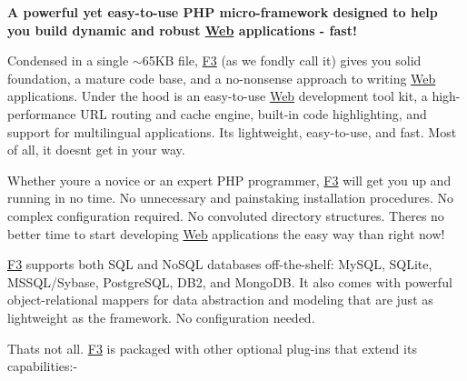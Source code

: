\href{http://fatfree.sf.net/}{\tt }

{\bfseries A powerful yet easy-\/to-\/use P\+HP micro-\/framework designed to help you build dynamic and robust \hyperlink{class_web}{Web} applications -\/ fast!}

\href{https://flattr.com/submit/auto?user_id=phpfatfree&url=https://github.com/bcosca/fatfree}{\tt }

Condensed in a single $\sim$65\+KB file, \hyperlink{class_f3}{F3} (as we fondly call it) gives you solid foundation, a mature code base, and a no-\/nonsense approach to writing \hyperlink{class_web}{Web} applications. Under the hood is an easy-\/to-\/use \hyperlink{class_web}{Web} development tool kit, a high-\/performance U\+RL routing and cache engine, built-\/in code highlighting, and support for multilingual applications. It\textquotesingle{}s lightweight, easy-\/to-\/use, and fast. Most of all, it doesn\textquotesingle{}t get in your way.

Whether you\textquotesingle{}re a novice or an expert P\+HP programmer, \hyperlink{class_f3}{F3} will get you up and running in no time. No unnecessary and painstaking installation procedures. No complex configuration required. No convoluted directory structures. There\textquotesingle{}s no better time to start developing \hyperlink{class_web}{Web} applications the easy way than right now!

\hyperlink{class_f3}{F3} supports both S\+QL and No\+S\+QL databases off-\/the-\/shelf\+: My\+S\+QL, S\+Q\+Lite, M\+S\+S\+Q\+L/\+Sybase, Postgre\+S\+QL, D\+B2, and Mongo\+DB. It also comes with powerful object-\/relational mappers for data abstraction and modeling that are just as lightweight as the framework. No configuration needed.

That\textquotesingle{}s not all. \hyperlink{class_f3}{F3} is packaged with other optional plug-\/ins that extend its capabilities\+:-\/


